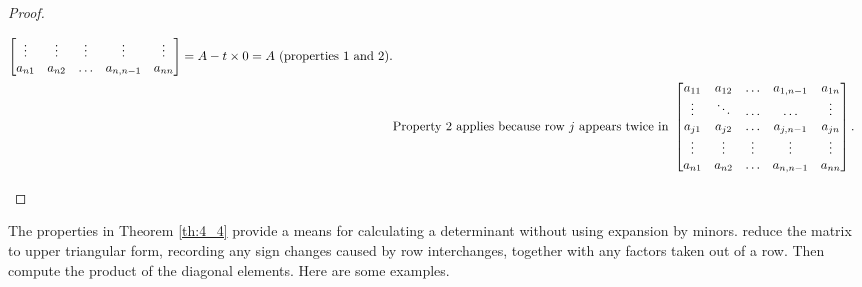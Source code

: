 \documentclass[../main.tex]{subfiles}
\begin{document}
\begin{proof}
\begin{enumerate}[leftmargin=*]
\begin{equation*}
\begin{aligned}
\begin{bmatrix}
           \vdots & \vdots & \vdots & \vdots & \vdots\\
           a_{n1} & a_{n2} & \hdots & a_{n,n-1} & a_{nn}
         \end{bmatrix}
        = A - t \times 0 = A \text{ (properties 1 and 2)}.\\
        &\text{Property 2 applies because row } j \text{ appears twice in }\begin{bmatrix}
          a_{11} & a_{12} & \hdots & a_{1,n-1} & a_{1n}\\
          \vdots & \ddots & \hdots & \hdots & \vdots\\
          a_{j1} & a_{j2} & \hdots & a_{j,n-1} & a_{jn}\\
          \vdots & \vdots & \vdots & \vdots & \vdots\\
          a_{n1} & a_{n2} & \hdots & a_{n,n-1} & a_{nn}
        \end{bmatrix}.
      \end{aligned}\\
    \end{equation*}
    
  \end{enumerate}
\end{proof}

The properties in Theorem \ref{th:4_4}  provide a means for calculating a determinant without using expansion by minors. reduce the matrix to upper triangular form, recording any sign changes caused by row interchanges, together with any factors taken out of a row. Then compute the product of the diagonal elements. Here are some examples.
\end{document}
